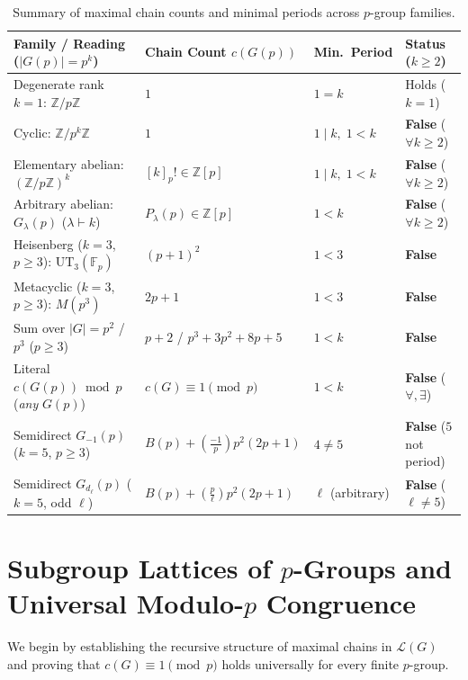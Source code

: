 \documentclass[11pt,a4paper]{article}
\theoremstyle{definition}
\newcommand{\UT}{\mathrm{UT}}
\newcommand{\Fp}{\mathbb{F}_p}
\newcommand{\Leg}[2]{\left(\frac{#1}{#2}\right)}
\begin{document}
\begin{table}[ht]
\centering
\footnotesize
\begin{tabular}{@{}llll@{}}
\hline
\textbf{Family / Reading ($|G(p)| = p^k$)} & \textbf{Chain Count $c(G(p))$} & \textbf{Min.\ Period} & \textbf{Status ($k \ge 2$)} \\
\hline
Degenerate rank $k = 1$: $\mathbb{Z}/p\mathbb{Z}$ & $1$ & $1 = k$ & Holds ($k = 1$) \\
Cyclic: $\mathbb{Z}/p^k\mathbb{Z}$ & $1$ & $1 \mid k,\; 1 < k$ & \textbf{False} ($\forall k \ge 2$) \\
Elementary abelian: $(\mathbb{Z}/p\mathbb{Z})^k$ & $[k]_p! \in \mathbb{Z}[p]$ & $1 \mid k,\; 1 < k$ & \textbf{False} ($\forall k \ge 2$) \\
Arbitrary abelian: $G_\lambda(p)$ ($\lambda \vdash k$) & $P_\lambda(p) \in \mathbb{Z}[p]$ & $1 < k$ & \textbf{False} ($\forall k \ge 2$) \\
Heisenberg ($k = 3$, $p \ge 3$): $\UT_3(\Fp)$ & $(p + 1)^2$ & $1 < 3$ & \textbf{False} \\
Metacyclic ($k = 3$, $p \ge 3$): $M(p^3)$ & $2p + 1$ & $1 < 3$ & \textbf{False} \\
Sum over $|G| = p^2$ / $p^3$ ($p \ge 3$) & $p+2$ / $p^3+3p^2+8p+5$ & $1 < k$ & \textbf{False} \\
Literal $c(G(p)) \bmod p$ (\emph{any} $G(p)$) & $c(G) \equiv 1 \pmod p$ & $1 < k$ & \textbf{False} ($\forall,\exists$) \\
Semidirect $G_{-1}(p)$ ($k = 5$, $p \ge 3$) & $B(p) + \Leg{-1}{p}p^2(2p+1)$ & $4 \ne 5$ & \textbf{False} ($5$ not period) \\
Semidirect $G_{d_\ell}(p)$ ($k = 5$, odd $\ell$) & $B(p) + \Leg{p}{\ell}p^2(2p+1)$ & $\ell$ (arbitrary) & \textbf{False} ($\ell \ne 5$) \\
\hline
\end{tabular}
\caption{Summary of maximal chain counts and minimal periods across $p$-group families.}
\label{tab:verdict}
\end{table}

\section{Subgroup Lattices of $p$-Groups and Universal Modulo-$p$ Congruence}

We begin by establishing the recursive structure of maximal chains in $\mathcal{L}(G)$ and proving that $c(G) \equiv 1 \pmod p$ holds universally for every finite $p$-group.
\end{document}
